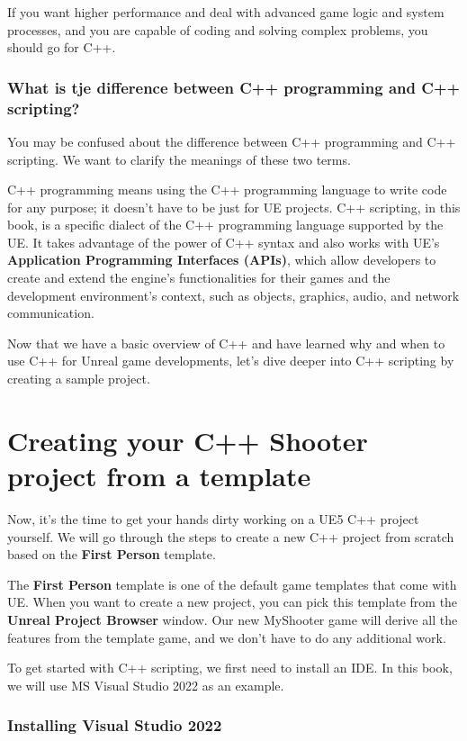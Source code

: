 \documentclass[11pt]{article} %
\begin{document}
If you want higher performance and deal with advanced game logic and system processes, and you are capable of coding and solving complex problems, you should go for C++.

\subsubsection*{What is tje difference between C++ programming and C++ scripting?}

You may be confused about the difference between C++ programming and C++ scripting. We want to clarify the meanings of these two terms.

C++ programming means using the C++ programming language to write code for any purpose; it doesn’t have to be just for UE projects. C++ scripting, in this book, is a specific dialect of the C++ programming language supported by the UE. It takes advantage of the power of C++ syntax and also works with UE’s \textbf{Application Programming Interfaces (APIs)}, which allow developers to create and extend the engine’s functionalities for their games and the development environment’s context, such as objects, graphics, audio, and network communication.

Now that we have a basic overview of C++ and have learned why and when to use C++ for Unreal game developments, let’s dive deeper into C++ scripting by creating a sample project.

\section*{Creating your C++ Shooter project from a template}

Now, it’s the time to get your hands dirty working on a UE5 C++ project yourself. We will go through the steps to create a new C++ project from scratch based on the \textbf{First Person} template.

The \textbf{First Person} template is one of the default game templates that come with UE. When you want to create a new project, you can pick this template from the \textbf{Unreal Project Browser} window. Our new MyShooter game will derive all the features from the template game, and we don’t have to do any additional work.

To get started with C++ scripting, we first need to install an IDE. In this book, we will use MS Visual Studio 2022 as an example.

\subsubsection*{Installing Visual Studio 2022}
\end{document}
